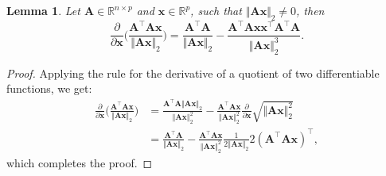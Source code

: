 \documentclass[a4paper, 12pt]{article}
\newcommand{\T}{\top}
\def\bx{\boldsymbol{x}}
\def\bA{\mathbf{A}}
\def\bx{\mathbf{x}}
\newtheorem{lemma}{Lemma}
\begin{document}
%
\begin{lemma}
\label{lemma:product_Ax_norm_fd}
Let $\bA\in\mathbb{R}^{n\times p}$ and $\bx\in\mathbb{R}^p$, such that $\Vert\bA\bx\Vert_2 \neq 0$, then
\begin{equation*}
\frac{\partial}{\partial \bx} \Bigg(\frac{\bA^{{\T}} \bA \bx}{\Vert\bA\bx\Vert_2}\Bigg)=\frac{\bA^{{\T}} \bA}{\Vert\bA \bx\Vert_2}-\frac{\bA^{{\T}} \bA \bx\bx^{{\T}} \bA^{{\T}} \bA}{\Vert\bA \bx\Vert_2^3}.
\end{equation*}  
\end{lemma}
\begin{proof}
Applying the rule for the derivative of a quotient of two differentiable functions, we get:
\begin{equation*}
\begin{aligned}
\frac{\partial}{\partial \bx} \Bigg(\frac{\bA^{{\T}} \bA \bx}{\Vert\bA\bx\Vert_2}\Bigg)&= \frac{\bA^{{\T}} \bA\Vert \bA \bx\Vert_2}{\Vert\bA \bx\Vert_2^2}-\frac{\bA^{{\T}} \bA \bx}{\Vert\bA\bx\Vert_2^2}\frac{\partial}{\partial \bx} \sqrt{\Vert\bA \bx\Vert_2^2} \\
&= \frac{\bA^{{\T}} \bA}{\Vert\bA \bx\Vert_2}-\frac{\bA^{{\T}} \bA \bx}{\Vert\bA \bx\Vert_2^2}  \frac{1}{2\Vert\bA\bx\Vert_2} 2(\bA^{\T}\bA\bx)^{\T},
\end{aligned}
\end{equation*}
which completes the proof.
\end{proof}
\end{document}
